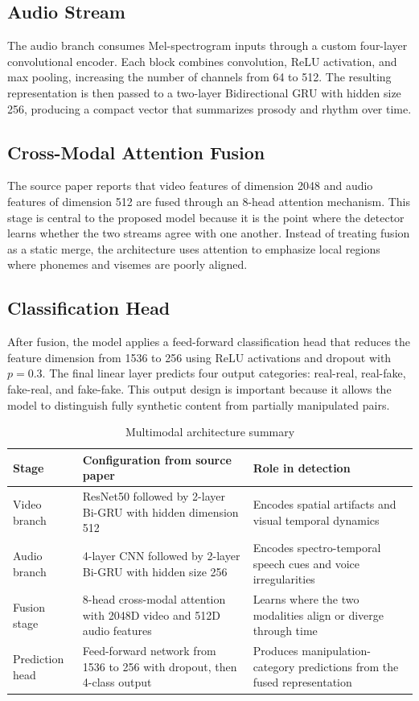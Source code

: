 \subsection{Audio Stream}

The audio branch consumes Mel-spectrogram inputs through a custom four-layer convolutional encoder. Each block combines convolution, ReLU activation, and max pooling, increasing the number of channels from 64 to 512. The resulting representation is then passed to a two-layer Bidirectional GRU with hidden size 256, producing a compact vector that summarizes prosody and rhythm over time.

\subsection{Cross-Modal Attention Fusion}

The source paper reports that video features of dimension 2048 and audio features of dimension 512 are fused through an 8-head attention mechanism. This stage is central to the proposed model because it is the point where the detector learns whether the two streams agree with one another. Instead of treating fusion as a static merge, the architecture uses attention to emphasize local regions where phonemes and visemes are poorly aligned.

\subsection{Classification Head}

After fusion, the model applies a feed-forward classification head that reduces the feature dimension from 1536 to 256 using ReLU activations and dropout with $p=0.3$. The final linear layer predicts four output categories: real-real, real-fake, fake-real, and fake-fake. This output design is important because it allows the model to distinguish fully synthetic content from partially manipulated pairs.

\begin{table}[H]
\centering
\small
\caption{Multimodal architecture summary}
\label{tab:multimodal-architecture}
\begin{tabular}{p{}p{}p{}}
\toprule
\textbf{Stage} & \textbf{Configuration from source paper} & \textbf{Role in detection} \\
\midrule
Video branch & ResNet50 followed by 2-layer Bi-GRU with hidden dimension 512 & Encodes spatial artifacts and visual temporal dynamics \\
Audio branch & 4-layer CNN followed by 2-layer Bi-GRU with hidden size 256 & Encodes spectro-temporal speech cues and voice irregularities \\
Fusion stage & 8-head cross-modal attention with 2048D video and 512D audio features & Learns where the two modalities align or diverge through time \\
Prediction head & Feed-forward network from 1536 to 256 with dropout, then 4-class output & Produces manipulation-category predictions from the fused representation \\
\bottomrule
\end{tabular}
\end{table}

